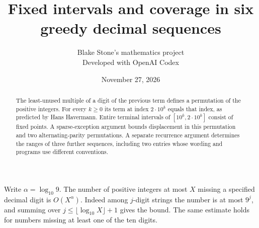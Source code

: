 \documentclass[11pt]{article}
\title{Fixed intervals and coverage in six greedy decimal sequences}
\author{Blake Stone's mathematics project\\\small Developed with OpenAI Codex}
\date{November 27, 2026}
\begin{document}
\maketitle
\begin{abstract}
The least-unused multiple of a digit of the previous term defines a permutation of the positive integers. For every $k\ge0$ its term at index $2\cdot10^k$ equals that index, as predicted by Hans Havermann. Entire terminal intervals of $[10^k,2\cdot10^k]$ consist of fixed points. A sparse-exception argument bounds displacement in this permutation and two alternating-parity permutations. A separate recurrence argument determines the ranges of three further sequences, including two entries whose wording and programs use different conventions.
\end{abstract}
Write $\alpha=\log_{10}9$. The number of positive integers at most $X$ missing a specified decimal digit is $O(X^\alpha)$. Indeed among $j$-digit strings the number is at most $9^j$, and summing over $j\le\lfloor\log_{10} X\rfloor+1$ gives the bound. The same estimate holds for numbers missing at least one of the ten digits.
\end{document}
